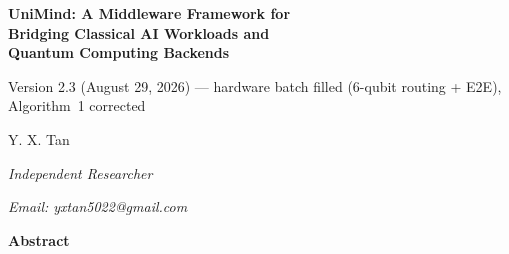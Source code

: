 ﻿\documentclass[12pt,a4paper]{article}
\begin{document}
\begin{titlepage}
\centering
\vspace*{2cm}

{\LARGE\bfseries UniMind: A Middleware Framework for\\[6pt]
Bridging Classical AI Workloads and\\[6pt]
Quantum Computing Backends\par}

\vspace{0.8cm}

{\normalsize\rmfamily Version 2.3 (August 29, 2026) --- hardware batch filled (6-qubit routing + E2E), Algorithm~1 corrected\par}

\vspace{1.2cm}

{\Large Y. X. Tan\par}
\vspace{0.3cm}
{\normalsize\itshape Independent Researcher\par}
{\normalsize\itshape Email: yxtan5022@gmail.com\par}

\vspace{1.8cm}

{\large\bfseries Abstract\par}
\vspace{0.5cm}


\end{titlepage}
\end{document}
